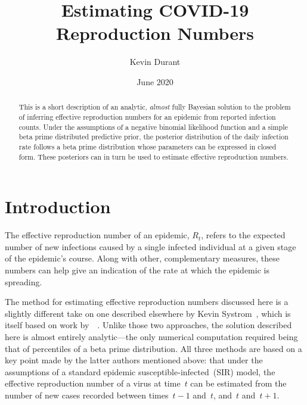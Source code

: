 \documentclass[12pt,a4paper]{article}
\title{Estimating COVID-19 Reproduction Numbers}
\author{Kevin Durant}
\date{June 2020}
\begin{document}
\maketitle

\begin{abstract}
This is a short description of an analytic, \emph{almost} fully Bayesian
solution to the problem of inferring effective reproduction numbers for an
epidemic from reported infection counts. Under the assumptions of a negative
binomial likelihood function and a simple beta prime distributed predictive
prior, the posterior distribution of the daily infection rate follows a beta
prime distribution whose parameters can be expressed in closed form. These
posteriors can in turn be used to estimate effective reproduction numbers.
\end{abstract}

\section{Introduction} %

The effective reproduction number of an epidemic, $R_t$, refers to the expected
number of new infections caused by a single infected individual at a given stage
of the epidemic's course. Along with other, complementary measures, these
numbers can help give an indication of the rate at which the epidemic is
spreading.

The method for estimating effective reproduction numbers discussed here is a
slightly different take on one described elsewhere by Kevin
Systrom~\cite{systrom2020}, which is itself based on work
by~\citeauthor{bettencourt2008}~\cite{bettencourt2008}. Unlike those two
approaches, the solution described here is almost entirely analytic---the only
numerical computation required being that of percentiles of a beta prime
distribution. All three methods are based on a key point made by the latter
authors mentioned above: that under the assumptions of a standard epidemic
susceptible-infected~(SIR) model, the effective reproduction number of a virus
at time~$t$ can be estimated from the number of new cases recorded between
times~$t-1$ and~$t$, and~$t$ and~$t+1$.
\end{document}
